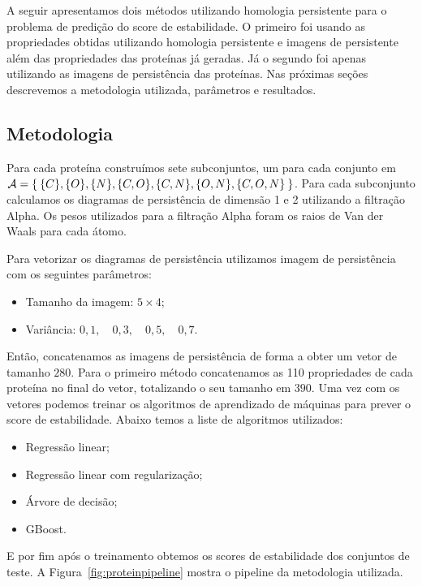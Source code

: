 A seguir apresentamos dois métodos utilizando homologia persistente para o problema de predição
do score de estabilidade. O primeiro foi usando as propriedades obtidas utilizando
homologia persistente e imagens de persistente além das propriedades das proteínas já geradas. 
Já o segundo foi apenas utilizando as imagens de persistência das proteínas. Nas próximas
seções descrevemos a metodologia utilizada, parâmetros e resultados.

\subsection{Metodologia}
Para cada proteína construímos sete subconjuntos, um para cada conjunto em $\mathcal{A} = \Set{\{C\}, \{O\}, \{N\}, 
\{C, O\}, \{C, N\}, \{O,N\}, \{C,O,N\}}$. Para cada subconjunto calculamos os diagramas de persistência
de dimensão 1 e 2 utilizando a filtração Alpha. Os pesos utilizados para a filtração Alpha foram os raios
de Van der Waals para cada átomo. 

Para vetorizar os diagramas de persistência utilizamos imagem de persistência com os seguintes parâmetros:
\begin{itemize}
    \item Tamanho da imagem: $5 \times 4$;
    \item Variância: $0,1,\quad 0,3,\quad 0,5,\quad 0,7$. 
\end{itemize}

Então, concatenamos as imagens de persistência de forma a obter um vetor de tamanho $280$. Para o
primeiro método concatenamos as 110 propriedades de cada proteína no final do vetor, totalizando 
o seu tamanho em $390$. Uma vez com os vetores podemos treinar os algoritmos de aprendizado de máquinas
para prever o score de estabilidade. Abaixo temos a liste de algoritmos utilizados:
\begin{itemize}
    \item Regressão linear;
    \item Regressão linear com regularização; 
    \item Árvore de decisão;
    \item GBoost. 
\end{itemize}
E por fim após o treinamento obtemos os scores de estabilidade dos conjuntos de teste. 
A Figura~\ref{fig:proteinpipeline} mostra o pipeline da metodologia utilizada. 

